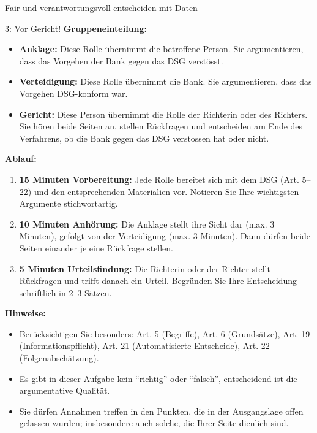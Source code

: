 \begin{lpu}{Fair und verantwortungsvoll entscheiden mit Daten}
\begin{aufgabe}{3: Vor Gericht!}
\vspace{1em}
\textbf{Gruppeneinteilung:}

\begin{itemize}
  \item \textbf{Anklage:}  
  Diese Rolle übernimmt die betroffene Person. Sie argumentieren, dass das Vorgehen der Bank gegen das DSG verstösst.

  \item \textbf{Verteidigung:}  
  Diese Rolle übernimmt die Bank. Sie argumentieren, dass das Vorgehen DSG-konform war.

  \item \textbf{Gericht:}  
  Diese Person übernimmt die Rolle der Richterin oder des Richters. Sie hören beide Seiten an, stellen Rückfragen und entscheiden am Ende des Verfahrens, ob die Bank gegen das DSG verstossen hat oder nicht.
\end{itemize}

\vspace{1em}
\textbf{Ablauf:}

\begin{enumerate}
  \item \textbf{15 Minuten Vorbereitung:}  
  Jede Rolle bereitet sich mit dem DSG (Art. 5–22) und den entsprechenden Materialien vor. Notieren Sie Ihre wichtigsten Argumente stichwortartig.

  \item \textbf{10 Minuten Anhörung:}  
  Die Anklage stellt ihre Sicht dar (max. 3 Minuten), gefolgt von der Verteidigung (max. 3 Minuten). Dann dürfen beide Seiten einander je eine Rückfrage stellen.

  \item \textbf{5 Minuten Urteilsfindung:}  
  Die Richterin oder der Richter stellt Rückfragen und trifft danach ein Urteil. Begründen Sie Ihre Entscheidung schriftlich in 2–3 Sätzen.

\end{enumerate}

\vspace{0.5em}
\textbf{Hinweise:}

\begin{itemize}
  \item Berücksichtigen Sie besonders: Art. 5 (Begriffe), Art. 6 (Grundsätze), Art. 19 (Informationspflicht), Art. 21 (Automatisierte Entscheide), Art. 22 (Folgenabschätzung).
  \item Es gibt in dieser Aufgabe kein ``richtig'' oder ``falsch'', entscheidend ist die argumentative Qualität.
  \item Sie dürfen Annahmen treffen in den Punkten, die in der Ausgangslage offen gelassen wurden; insbesondere auch solche, die Ihrer Seite dienlich sind.
\end{itemize}


\end{aufgabe}
\end{lpu}
